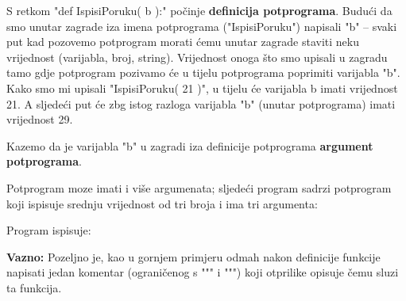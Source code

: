 S retkom "def IspisiPoruku( b ):" počinje \textbf{definicija potprograma}.
Budući da smo unutar zagrade iza imena potprograma ("IspisiPoruku")
napisali "b" -- svaki put kad pozovemo potprogram morati ćemu unutar
zagrade staviti neku vrijednost (varijabla, broj, string). Vrijednost onoga
što smo upisali u zagradu tamo gdje potprogram pozivamo će u tijelu
potprograma
poprimiti varijabla "b". Kako smo mi upisali "IspisiPoruku( 21 )", u tijelu
će varijabla b imati vrijednost 21. A sljedeći put će
zbg istog razloga varijabla "b" (unutar potprograma) imati vrijednost 29.

Kazemo da je varijabla "b" u zagradi iza definicije potprograma
\textbf{argument potprograma}.

Potprogram moze imati i više argumenata; sljedeći program
sadrzi potprogram koji ispisuje srednju vrijednost od tri broja i ima
tri argumenta:


Program ispisuje:


\textbf{Vazno:} Pozeljno je, kao u gornjem primjeru odmah nakon
definicije funkcije napisati jedan komentar (ograničenog s """ i """)
koji otprilike opisuje čemu sluzi ta funkcija.

